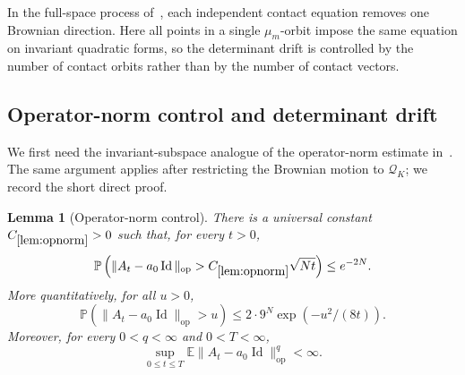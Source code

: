 \documentclass[11pt]{article}
\newtheorem{lemma}[theorem]{Lemma}
\theoremstyle{remark}
\newcommand{\Id}{\operatorname{Id}}
\newcommand{\E}{\mathbb E}
\newcommand{\Prob}{\mathbb P}
\newcommand{\op}{\operatorname{op}}
\begin{document}
In the full-space process of~\cite{Klartag}, each independent contact equation removes one
Brownian direction.  Here all points in a single $\mu_m$-orbit impose the same
equation on invariant quadratic forms, so the determinant drift is controlled
by the number of contact orbits rather than by the number of contact vectors.

\subsection{Operator-norm control and determinant drift}

We first need the invariant-subspace analogue of the operator-norm estimate
in~\cite[Lemma~3.1 and Corollary~3.2]{Klartag}.  The same argument applies after
restricting the Brownian motion to $\mathcal Q_K$; we record the
short direct proof.

\begin{lemma}[Operator-norm control]\label{lem:opnorm}
There is a universal constant $C_{\ref{lem:opnorm}}>0$ such that, for every
$t>0$,
\[
        \Prob\left(\|A_t-a_0\Id\|_{\op}>
        C_{\ref{lem:opnorm}}\sqrt{Nt}\right)
        \le e^{-2N}.
\]
More quantitatively, for all $u>0$,
\begin{equation}
        \Prob\left(\|A_t-a_0\Id\|_{\op}>u\right)
        \le 2\cdot 9^N\exp\left(-u^2/(8t)\right).
\label{eq:op-full-tail}
\end{equation}
Moreover, for every $0<q<\infty$ and $0<T<\infty$,
\[
        \sup_{0\le t\le T}\E\|A_t-a_0\Id\|_{\op}^q<\infty.
\]
\end{lemma}
\end{document}
